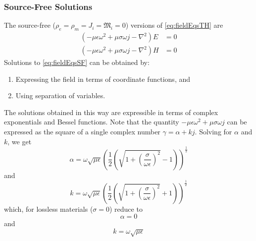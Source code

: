\documentclass{article}
\begin{document}
\subsubsection{Source-Free Solutions}
The source-free ($\rho_e = \rho_m = J_i = \mathfrak{M}_i = 0$) versions of \eqref{eq:fieldEqsTH} are
\begin{subequations} \label{eq:fieldEqsSF}
    \begin{align}
    (- \mu \epsilon \omega^2 + \mu \sigma \omega j - \nabla^2 ) E & = 0 \label{eq:electricFieldEqSF} \\
    ( - \mu \epsilon \omega^2 + \mu \sigma \omega j - \nabla^2 ) H & = 0 \label{eq:magneticFieldEqSF}
    \end{align}
\end{subequations}
Solutions to \eqref{eq:fieldEqsSF} can be obtained by:
\begin{enumerate}
    \item Expressing the field in terms of coordinate functions, and
    \item Using separation of variables.
\end{enumerate}
The solutions obtained in this way are expressible in terms of complex exponentials and Bessel functions.
Note that the quantity $- \mu \epsilon \omega^2 + \mu \sigma \omega j $ can be expressed as the square of a single complex number $\gamma = \alpha + kj$. Solving for $\alpha$ and $k$, we get
\begin{equation} \label{eq:attenuationConstant}
    \alpha = \omega \sqrt{\mu \epsilon} \left( \frac{1}{2} \left( \sqrt{1 + \left( \frac{\sigma}{\omega \epsilon} \right)^2 } - 1 \right)  \right)^{\frac{1}{2}}
\end{equation}
and
\begin{equation} \label{eq:wavenumber}
    k = \omega \sqrt{\mu \epsilon} \left( \frac{1}{2} \left( \sqrt{1 + \left( \frac{\sigma}{\omega \epsilon} \right)^2 } + 1 \right)  \right)^{\frac{1}{2}}
\end{equation}
which, for lossless materials ($\sigma = 0$) reduce to
\begin{equation} \label{eq:attenuationConstantLossless}
    \alpha = 0
\end{equation}
and
\begin{equation} \label{eq:wavenumberLossless}
    k = \omega \sqrt{\mu \epsilon}
\end{equation}
\end{document}
